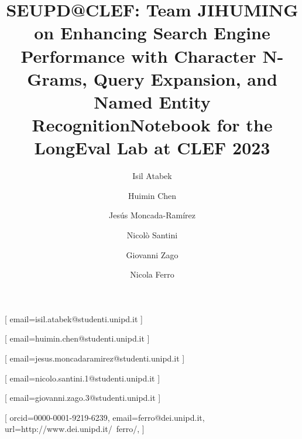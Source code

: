 \documentclass{ceurart}
\begin{document}


\title{SEUPD@CLEF: Team JIHUMING on Enhancing Search Engine Performance with Character N-Grams, Query Expansion, and Named Entity Recognition}

\title[mode=sub]{Notebook for the LongEval Lab at CLEF 2023}

\author[1]{Isil Atabek}[%
email=isil.atabek@studenti.unipd.it
]

\author[1]{Huimin Chen}[%
email=huimin.chen@studenti.unipd.it
]

\author[1]{Jes\'us Moncada-Ram\'irez}[%
email=jesus.moncadaramirez@studenti.unipd.it
]

\author[1]{Nicol\`o Santini}[%
email=nicolo.santini.1@studenti.unipd.it
]

\author[1]{Giovanni Zago}[%
email=giovanni.zago.3@studenti.unipd.it
]

\author[1]{Nicola Ferro}[%
orcid=0000-0001-9219-6239,
email=ferro@dei.unipd.it,
url=http://www.dei.unipd.it/~ferro/,
]

\address[1]{University of Padua, Italy}
\end{document}
